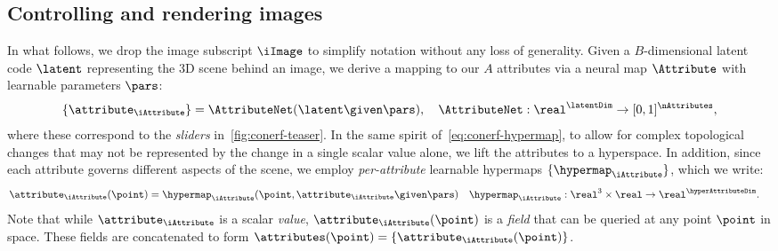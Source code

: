   \subsection{Controlling and rendering images}
    \label{sec:conerf-inference}
    In what follows, we drop the image subscript $\iImage$ to simplify
    notation without any loss of generality.
    Given a $B$-dimensional latent code $\latent$ representing the 3D scene behind an image, we derive a mapping to our $A$ attributes via a neural map $\Attribute$ with learnable parameters $\pars$:
    \begin{equation}
      \{ \attribute_\iAttribute \} = \AttributeNet(\latent \given \pars), \quad
      \AttributeNet : \real^\latentDim \rightarrow [0,1]^\nAttributes
      ,
    \end{equation}
    where these correspond to the \textit{sliders} in~\cref{fig:conerf-teaser}.
    In the same spirit of~\cref{eq:conerf-hypermap}, to allow for complex
    topological changes that may not be represented by the change in a single
    scalar value alone, we lift the attributes to a hyperspace.
    In addition, since each attribute governs different aspects of the scene, we employ \textit{per-attribute} learnable hypermaps $\{\hypermap_\iAttribute\}$, which we write:
    \begin{align}
      \attribute_\iAttribute(\point) & = \hypermap_\iAttribute(\point, \attribute_\iAttribute \given \pars) \quad \hypermap_\iAttribute: \real^3 \times \real \rightarrow \real^\hyperAttributeDim
      .
    \end{align}
    Note that while $\attribute_\iAttribute$ is a scalar \textit{value},
    $\attribute_\iAttribute(\point)$ is a \textit{field} that can be queried
    at any point $\point$ in space.
    These fields are concatenated to form
    $\attributes(\point)=\{\attribute_\iAttribute(\point)\}$.

